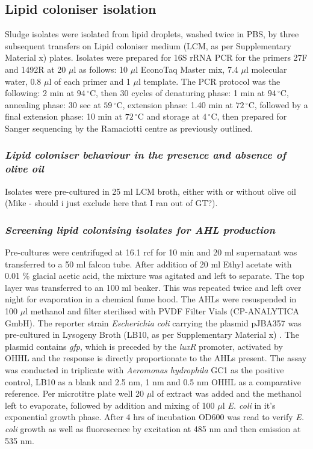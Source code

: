 \documentclass[11pt]{article}
\begin{document}
\subsection{Lipid coloniser isolation}
Sludge isolates  were isolated from lipid droplets, washed twice in PBS, by three subsequent transfers on Lipid coloniser medium (LCM, as per Supplementary Material x) plates. Isolates were prepared for 16S rRNA PCR for the primers 27F and 1492R at 20 $\mu$l as follows: 10 $\mu$l EconoTaq Master mix, 7.4 $\mu$l molecular water, 0.8 $\mu$l of each primer and 1 $\mu$l template. The PCR protocol was the following: 2 min at $94\,^{\circ}\mathrm{C}$, then 30 cycles of denaturing phase: 1 min at $94\,^{\circ}\mathrm{C}$, annealing phase: 30 sec at  $59\,^{\circ}\mathrm{C}$, extension phase: 1.40 min at $72\,^{\circ}\mathrm{C}$, followed by a final extension phase: 10 min at $72\,^{\circ}\mathrm{C}$ and storage at $4\,^{\circ}\mathrm{C}$, then prepared for Sanger sequencing by the Ramaciotti centre as previously outlined.

\subsubsection{\emph{Lipid coloniser behaviour in the presence and absence of olive oil}}
Isolates were pre-cultured in 25 ml LCM broth, either with or without olive oil (Mike - should i just exclude here that I ran out of GT?). 

\subsubsection{\emph{Screening lipid colonising isolates for AHL production}}
Pre-cultures were centrifuged at 16.1 rcf for 10 min and 20 ml supernatant was transferred to a 50 ml falcon tube. After addition of 20 ml Ethyl acetate with 0.01 \% glacial acetic acid, the mixture was agitated and left to separate. The top  layer was transferred to an 100 ml beaker. This was repeated twice and left over night for evaporation in a chemical fume hood. The AHLs were resuspended in 100  $\mu$l methanol and filter sterilised with PVDF Filter Vials (CP-ANALYTICA GmbH). 
 The reporter strain \emph{Escherichia coli} carrying the plasmid pJBA357 was pre-cultured in Lysogeny Broth (LB10, as per Supplementary Material x) \cite{bertani1951studies}. The plasmid contains \emph{gfp}, which  is preceded by the \emph{luxR} promoter, activated by OHHL and the response is directly proportionate to the AHLs present.
The assay was conducted in triplicate with \emph{Aeromonas hydrophila} GC1 as the positive control, LB10 as a blank and 2.5 nm, 1 nm and 0.5 nm OHHL as a comparative reference. Per microtitre plate well 20 $\mu$l of extract was added and the methanol left to evaporate, followed by addition and mixing of 100 $\mu$l \emph{E. coli} in it's exponential growth phase. After 4 hrs of incubation OD600 was read to verify \emph{E. coli} growth as well as fluorescence by excitation at 485 nm and then emission at 535 nm.
\end{document}
